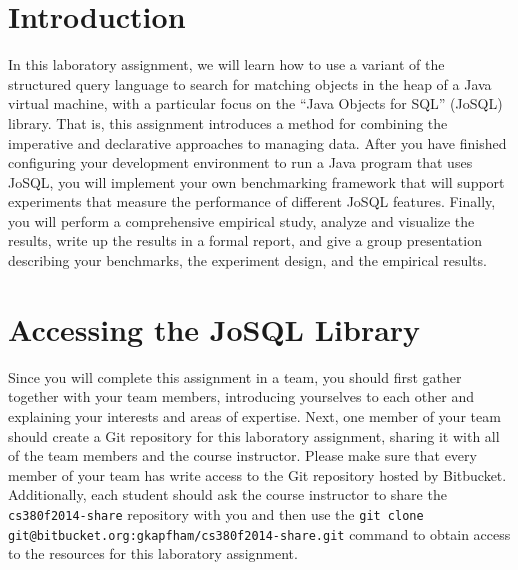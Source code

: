 


\usepackage[compact]{titlesec}



\section*{Introduction}

In this laboratory assignment, we will learn how to use a variant of the structured query language to search for
matching objects in the heap of a Java virtual machine, with a particular focus on the ``Java Objects for SQL'' (JoSQL)
library. That is, this assignment introduces a method for combining the imperative and declarative approaches to
managing data. After you have finished configuring your development environment to run a Java program that uses JoSQL,
you will implement your own benchmarking framework that will support experiments that measure the performance of
different JoSQL features.  Finally, you will perform a comprehensive empirical study, analyze and visualize the results,
write up the results in a formal report, and give a group presentation describing your benchmarks, the experiment
design, and the empirical results.

\section*{Accessing the JoSQL Library}

Since you will complete this assignment in a team, you should first gather together with your team members, introducing
yourselves to each other and explaining your interests and areas of expertise. Next, one member of your team should
create a Git repository for this laboratory assignment, sharing it with all of the team members and the course
instructor. Please make sure that every member of your team has write access to the Git repository hosted by Bitbucket.
Additionally, each student should ask the course instructor to share the {\tt cs380f2014-share} repository with you and
then use the {\tt git clone git@bitbucket.org:gkapfham/cs380f2014-share.git} command to obtain access to the resources
for this laboratory assignment.

